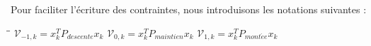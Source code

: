 	Pour faciliter l'écriture des contraintes, nous introduisons les notations suivantes : 
	\begin{tabbing}
		\hspace{5cm}\=\hspace{5cm}\=\kill
	$\mathcal{V}_{-1,k} = x_k^TP_{descente}x_k$	\> $\mathcal{V}_{0,k} = x_k^TP_{maintien}x_k$ \> $\mathcal{V}_{1,k} = x_k^TP_{mont\acute{e}e}x_k$
	\end{tabbing} 
	
